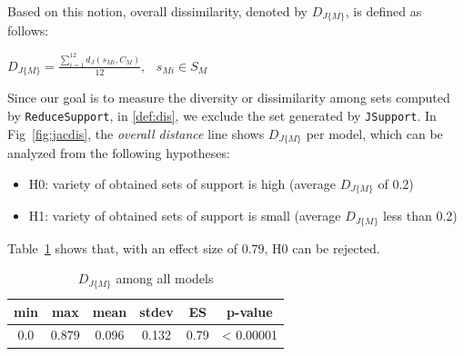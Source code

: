 Based on this notion, overall dissimilarity, denoted by $D_{J\{M\}}$, is defined as follows:

\begin{definition}
  \label{def:dis}
  $D_{J\{M\}} =  \frac{\sum_{i=1}^{12}d_J(s_{Mi}, C_M)}{12},   \hspace{9pt} s_{Mi} \in S_M$
\end{definition}

Since our goal is to measure the diversity or dissimilarity among sets computed by \texttt{ReduceSupport}, in \ref{def:dis}, we exclude the set generated by \texttt{JSupport}. In Fig~\ref{fig:jacdis}, the \emph{overall distance} line shows $D_{J\{M\}}$ per model, which can be analyzed from the following hypotheses:
\begin{itemize}
  \item H0: variety of obtained sets of support is high (average $D_{J\{M\}}$ of 0.2)
  \item H1: variety of obtained sets of support is small (average $D_{J\{M\}}$ less than 0.2)
\end{itemize}
Table~\ref{tab:variety} shows that, with an effect size of 0.79, H0 can be rejected.
\begin{table}
  \centering
  \begin{tabular}{ |c|c|c|c|c|c| }
    \hline
     min & max & mean & stdev & ES & p-value\\[0.5ex]
    \hline
     0.0   & 0.879 & 0.096 & 0.132 & 0.79 & < 0.00001 \\[0.5ex]
    \hline
  \end{tabular}
  \caption{$D_{J\{M\}}$ among all models}
  \label{tab:variety}
\end{table}


\vspace{6pt}
\noindent{}
 \vspace{6pt}

